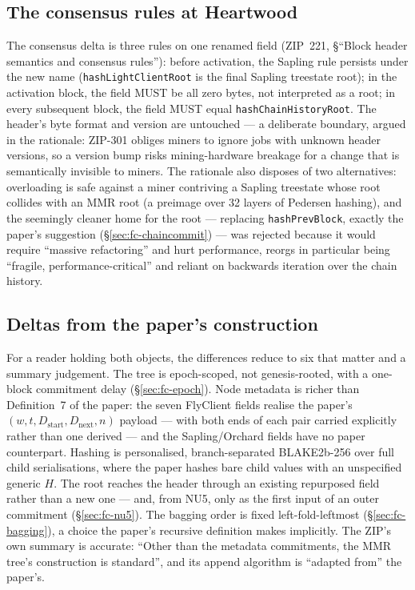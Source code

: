 \documentclass[11pt,a4paper]{article}
\theoremstyle{definition}
\begin{document}
\subsection{The consensus rules at Heartwood}\label{sec:fc-heartwood}

The consensus delta is three rules on one renamed field (ZIP~221,
\S``Block header semantics and consensus rules''): before activation, the
Sapling rule persists
under the new name (\texttt{hashLightClientRoot} is the final Sapling
treestate root); in the activation block, the field MUST be all zero
bytes, not interpreted as a root; in every subsequent block, the field
MUST equal \texttt{hashChainHistoryRoot}. The header's byte format and
version are untouched --- a deliberate boundary, argued in the
rationale: ZIP-301 obliges miners to ignore jobs with unknown header
versions, so a version bump risks mining-hardware breakage for a change
that is semantically invisible to miners. The rationale also disposes of
two alternatives: overloading is safe against a miner contriving a
Sapling treestate whose root collides with an MMR root (a preimage over
32 layers of Pedersen hashing), and the seemingly cleaner home for the
root --- replacing \texttt{hashPrevBlock}, exactly the paper's
suggestion (\S\ref{sec:fc-chaincommit}) --- was rejected because it would
require ``massive refactoring'' and hurt performance, reorgs in particular
being ``fragile, performance-critical'' and reliant on backwards iteration
over the chain history.

\subsection{Deltas from the paper's construction}\label{sec:fc-deltas}

For a reader holding both objects, the differences reduce to six that
matter and a summary judgement. The tree is epoch-scoped, not
genesis-rooted, with a one-block commitment delay
(\S\ref{sec:fc-epoch}). Node metadata is richer than Definition~7 of
the paper: the seven FlyClient fields realise the paper's
$(w, t, D_{\mathrm{start}}, D_{\mathrm{next}}, n)$ payload --- with both
ends of each pair carried explicitly rather than one derived --- and the
Sapling/Orchard fields have no paper counterpart. Hashing is
personalised, branch-separated BLAKE2b-256 over full child
serialisations, where the paper hashes bare child values with an
unspecified generic $H$. The root reaches the header through an existing
repurposed field rather than a new one --- and, from NU5, only as the
first input of an outer commitment (\S\ref{sec:fc-nu5}). The bagging
order is fixed left-fold-leftmost (\S\ref{sec:fc-bagging}), a choice the
paper's recursive definition makes implicitly. The ZIP's own summary is
accurate: ``Other than the metadata commitments, the MMR tree's
construction is standard'', and its append algorithm is ``adapted from''
the paper's.
\end{document}
